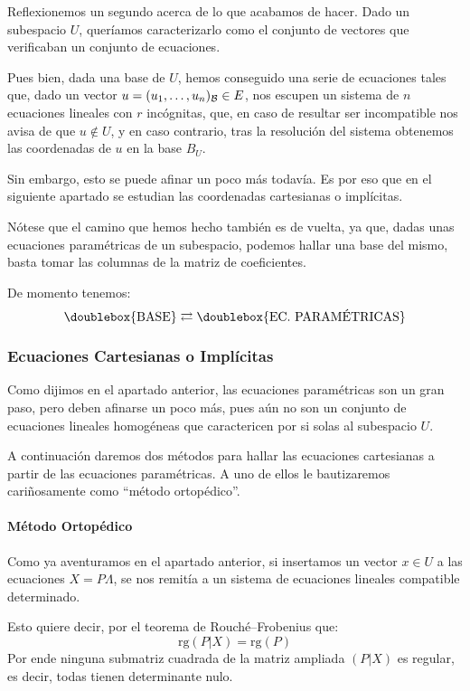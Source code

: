 Reflexionemos un segundo acerca de lo que acabamos de hacer. Dado un subespacio $U$, queríamos caracterizarlo como el conjunto de vectores que verificaban un conjunto de ecuaciones.

Pues bien, dada una base de $U$, hemos conseguido una serie de ecuaciones tales que, dado un vector $u=(u_1,\dots,u_n)_{\mathcal{B}}\in E$, nos escupen un sistema de $n$ ecuaciones lineales con $r$ incógnitas, que, en caso de resultar ser incompatible nos avisa de que $u\not\in U$, y en caso contrario, tras la resolución del sistema obtenemos las coordenadas de $u$ en la base $B_{U}$.

Sin embargo, esto se puede afinar un poco más todavía. Es por eso que en el siguiente apartado se estudian las coordenadas cartesianas o implícitas.

Nótese que el camino que hemos hecho también es de vuelta, ya que, dadas unas ecuaciones paramétricas de un subespacio, podemos hallar una base del mismo, basta tomar las columnas de la matriz de coeficientes.

De momento tenemos:
\begin{equation*}
\doublebox{\textrm{BASE}}\rightleftarrows\doublebox{\textrm{EC. PARAMÉTRICAS}}
\end{equation*}
\subsubsection{Ecuaciones Cartesianas o Implícitas}
Como dijimos en el apartado anterior, las ecuaciones paramétricas son un gran paso, pero deben afinarse un poco más, pues aún no son un conjunto de ecuaciones lineales homogéneas que caractericen por si solas al subespacio $U$.

A continuación daremos dos métodos para hallar las ecuaciones cartesianas a partir de las ecuaciones paramétricas. A uno de ellos le bautizaremos cariñosamente como ``método ortopédico''.

\paragraph{Método Ortopédico} Como ya aventuramos en el apartado anterior, si insertamos un vector $x\in U$ a las ecuaciones $X=P\Lambda$, se nos remitía a un sistema de ecuaciones lineales compatible determinado.

Esto quiere decir, por el teorema de Rouché--Frobenius que: \[\mathrm{rg}(P\vert X)=\mathrm{rg}(P)\] Por ende ninguna submatriz cuadrada de la matriz ampliada $(P\vert X)$ es regular, es decir, todas tienen determinante nulo.

